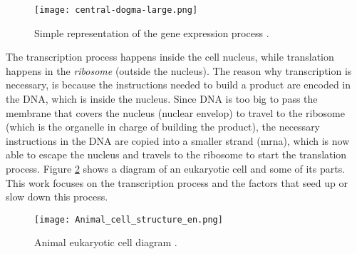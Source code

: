 \begin{figure}[htb]
  \centering
  \texttt{[image: central-dogma-large.png]}
  \caption{Simple representation of the gene expression process \cite{transcript_translation_diagram}.}
  \label{fig:BB:tt}
\end{figure}

The transcription process happens inside the cell nucleus, while translation happens in the \textit{ribosome} (outside the nucleus). The reason why transcription is necessary, is because the instructions needed to build a product are encoded in the DNA, which is inside the nucleus. Since DNA is too big to pass the membrane that covers the nucleus (nuclear envelop) to travel to the ribosome (which is the organelle in charge of building the product), the necessary instructions in the DNA are copied into a smaller strand (\gls{mrna}), which is now able to escape the nucleus and travels to the ribosome to start the translation process. Figure \ref{fig:BB:euka} shows a diagram of an eukaryotic cell and some of its parts. This work focuses on the transcription process and the factors that seed up or slow down this process.

\begin{figure}[htb]
  \centering
  \texttt{[image: Animal\_cell\_structure\_en.png]}
  \caption{Animal eukaryotic cell diagram \cite{eukacell}.}
  \label{fig:BB:euka}
\end{figure}
